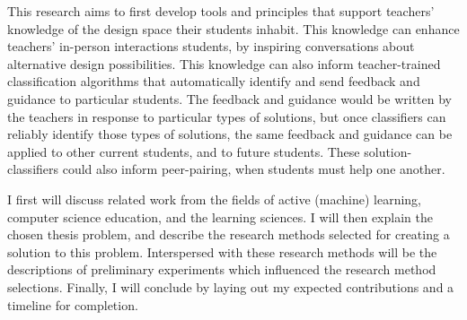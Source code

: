 \documentclass[12pt]{article}
\begin{document}
This research aims to first develop tools and principles that support teachers' knowledge of the design space their students inhabit. This knowledge can enhance teachers' in-person interactions students, by inspiring conversations about alternative design possibilities. This knowledge can also inform teacher-trained classification algorithms that automatically identify and send feedback and guidance to particular students. The feedback and guidance would be written by the teachers in response to particular types of solutions, but once classifiers can reliably identify those types of solutions, the same feedback and guidance can be applied to other current students, and to future students. These solution-classifiers could also inform peer-pairing, when students must help one another.

I first will discuss related work from the fields of active (machine) learning, computer science education, and the learning sciences. I will then explain the chosen thesis problem, and describe the research methods selected for creating a solution to this problem. Interspersed with these research methods will be the descriptions of preliminary experiments which influenced the research method selections. Finally, I will conclude by laying out my expected contributions and a timeline for completion.

%
\end{document}
